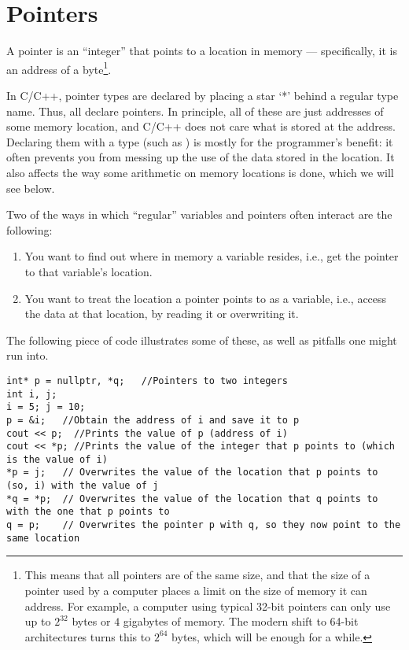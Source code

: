 \section{Pointers}
A pointer is an ``integer'' that points to a location in memory ---
specifically, it is an address of a byte\footnote{This means that all
pointers are of the same size, and that the size of a pointer used by
a computer places a limit on the size of memory it can address.
For example, a computer using typical 32-bit pointers can only use up to
$2^{32}$ bytes or $4$ gigabytes of memory.
The modern shift to 64-bit architectures turns this to $2^{64}$ bytes,
which will be enough for a while.}. 

In C/C++, pointer types are declared by placing a star `*' behind a
regular type name.
Thus,  all declare pointers.
In principle, all of these are just addresses of some memory location,
and C/C++ does not care what is stored at the address.
Declaring them with a type (such as ) is mostly for the
programmer's benefit:
it often prevents you from messing up the use of the
data stored in the location.
It also affects the way some arithmetic on memory locations is done,
which we will see below.

Two of the ways in which ``regular'' variables and pointers often
interact are the following:
\begin{enumerate}
\item You want to find out where in memory a variable resides, i.e.,
  get the pointer to that variable's location.
\item You want to treat the location a pointer points to as a variable,
  i.e., access the data at that location, by reading it or overwriting
  it.
\end{enumerate}
The following piece of code illustrates some of these, as well as
pitfalls one might run into.

\begin{verbatim}
int* p = nullptr, *q;	//Pointers to two integers
int i, j;
i = 5; j = 10;
p = &i;	  //Obtain the address of i and save it to p
cout << p;  //Prints the value of p (address of i)
cout << *p; //Prints the value of the integer that p points to (which is the value of i)
*p = j;   // Overwrites the value of the location that p points to (so, i) with the value of j
*q = *p;  // Overwrites the value of the location that q points to with the one that p points to
q = p;    // Overwrites the pointer p with q, so they now point to the same location
\end{verbatim}

